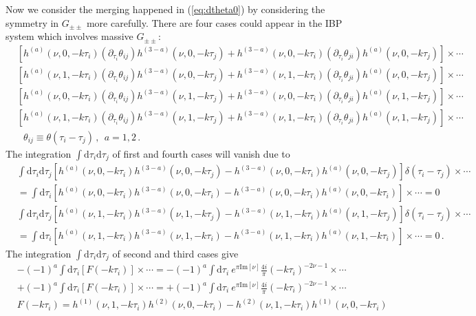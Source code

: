 \documentclass[a4paper,11pt]{article}
\newcommand{\nn}{\nonumber}
\newcommand{\nd}{\mathrm{d}}
\def\eqref#1{(\ref{#1})}
\begin{document}
Now we consider the merging happened in \eqref{eq:dtheta0} by considering the symmetry in  $G_{\pm \pm}$ more carefully.
There are four cases could appear in the IBP system which involves massive $G_{\pm \pm}$:
\begin{align}
&\left[h^{(a)}(\nu,0,-k\tau_i) (\partial_{\tau_i}\theta_{ij}) h^{(3-a)}(\nu,0,-k\tau_j) + h^{(3-a)}(\nu,0,-k\tau_i) (\partial_{\tau_i}\theta_{ji}) h^{(a)}(\nu,0,-k\tau_j) \right] \times \cdots  \nn\\
&\left[h^{(a)}(\nu,1,-k\tau_i) (\partial_{\tau_i}\theta_{ij}) h^{(3-a)}(\nu,0,-k\tau_j) + h^{(3-a)}(\nu,1,-k\tau_i) (\partial_{\tau_i}\theta_{ji}) h^{(a)}(\nu,0,-k\tau_j) \right] \times \cdots  \nn\\
&\left[h^{(a)}(\nu,0,-k\tau_i) (\partial_{\tau_i}\theta_{ij}) h^{(3-a)}(\nu,1,-k\tau_j) + h^{(3-a)}(\nu,0,-k\tau_i) (\partial_{\tau_i}\theta_{ji}) h^{(a)}(\nu,1,-k\tau_j) \right] \times \cdots  \nn\\
&\left[h^{(a)}(\nu,1,-k\tau_i) (\partial_{\tau_i}\theta_{ij}) h^{(3-a)}(\nu,1,-k\tau_j) + h^{(3-a)}(\nu,1,-k\tau_i) (\partial_{\tau_i}\theta_{ji}) h^{(a)}(\nu,1,-k\tau_j) \right] \times \cdots  \nn\\
& ~~~ \theta_{ij} \equiv \theta(\tau_i-\tau_j)  \,, \ \ a=1,2 \, .
\end{align}
The integration $\int \nd\tau_i \nd \tau_j$ of first and fourth cases will vanish due to
\begin{align}
&\int \nd \tau_i \nd \tau_j \left[h^{(a)}(\nu,0,-k\tau_i) h^{(3-a)}(\nu,0,-k\tau_j) - h^{(3-a)}(\nu,0,-k\tau_i) h^{(a)}(\nu,0,-k\tau_j) \right]  \delta(\tau_i-\tau_j) \times \cdots  \nn\\
&= \int \nd \tau_i \left[h^{(a)}(\nu,0,-k\tau_i) h^{(3-a)}(\nu,0,-k\tau_i) - h^{(3-a)}(\nu,0,-k\tau_i) h^{(a)}(\nu,0,-k\tau_i) \right] \times \cdots =0 \nn\\
&\int \nd \tau_i \nd \tau_j \left[h^{(a)}(\nu,1,-k\tau_i) h^{(3-a)}(\nu,1,-k\tau_j) - h^{(3-a)}(\nu,1,-k\tau_i) h^{(a)}(\nu,1,-k\tau_j) \right]  \delta(\tau_i-\tau_j) \times \cdots  \nn\\
&= \int \nd \tau_i \left[h^{(a)}(\nu,1,-k\tau_i) h^{(3-a)}(\nu,1,-k\tau_i) - h^{(3-a)}(\nu,1,-k\tau_i) h^{(a)}(\nu,1,-k\tau_i) \right] \times \cdots =0  \, . \label{eq:vanishR}
\end{align}
The integration $\int \nd\tau_i \nd \tau_j$ of second and third cases give
\begin{align}
&  - (-1)^a\int \nd \tau_i \left[F(-k\tau_i) \right]  \times \cdots =  - (-1)^a\int \nd\tau_i ~e^{ \pi \text{Im}[\nu]} \frac{  4 i }{\pi}  (-k\tau_i)^{-2\nu-1} \times \cdots \nn\\
&  + (-1)^a \int \nd \tau_i \left[F(-k\tau_i) \right]  \times \cdots =  + (-1)^a \int \nd\tau_i ~e^{ \pi \text{Im}[\nu]}\frac{  4 i }{\pi}  (-k\tau_i)^{-2\nu-1} \times \cdots \nn\\
& F(-k\tau_i) =h^{(1)}(\nu,1,-k\tau_i)  h^{(2)}(\nu,0,-k\tau_i) - h^{(2)}(\nu,1,-k\tau_i)  h^{(1)}(\nu,0,-k\tau_i) \label{eq:pinchR} 
\end{align}
\end{document}
